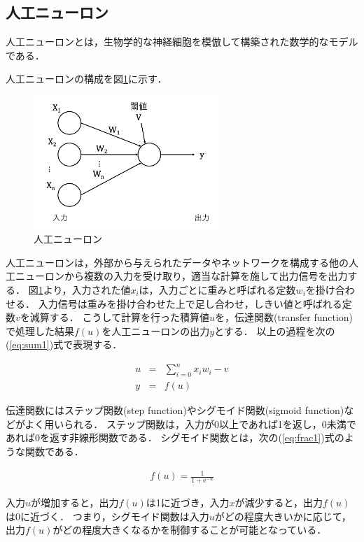 \documentclass[a4j,12pt,dvipdfmx]{jreport}
\begin{document}
\subsection{人工ニューロン}
人工ニューロンとは，生物学的な神経細胞を模倣して構築された数学的なモデルである．

人工ニューロンの構成を図\ref{fig:neuron}に示す．

\begin{figure}[b]
  \centering
  \includegraphics[width=7cm]{image/neuron.png}
  \caption{人工ニューロン}
  \label{fig:neuron}
\end{figure}

人工ニューロンは，外部から与えられたデータやネットワークを構成する他の人工ニューロンから複数の入力を受け取り，適当な計算を施して出力信号を出力する．
図\ref{fig:neuron}より，入力された値$x_i$は，入力ごとに重みと呼ばれる定数$w_i$を掛け合わせる．
入力信号は重みを掛け合わせた上で足し合わせ，しきい値と呼ばれる定数$v$を減算する．
こうして計算を行った積算値$u$を，伝達関数(transfer function)で処理した結果$f(u)$を人工ニューロンの出力$y$とする．
以上の過程を次の(\ref{eq:sum1})式で表現する．


\begin{eqnarray}
  \label{eq:sum1}
  u &=& \sum_{i=0}^n x_i w_i - v \nonumber \\
  y &=& f(u)
\end{eqnarray}

伝達関数にはステップ関数(step function)やシグモイド関数(sigmoid function)などがよく用いられる．
ステップ関数は，入力が0以上であれば1を返し，0未満であれば0を返す非線形関数である．
シグモイド関数とは，次の(\ref{eq:frac1})式のような関数である．

\begin{eqnarray}
  \label{eq:frac1}
  f(u) = \frac{1}{1 + \mathrm{e}^{-u}}
\end{eqnarray}

入力$u$が増加すると，出力$f(u)$は1に近づき，入力$x$が減少すると，出力$f(u)$は0に近づく．
つまり，シグモイド関数は入力$u$がどの程度大きいかに応じて，出力$f(u)$がどの程度大きくなるかを制御することが可能となっている．
\end{document}
